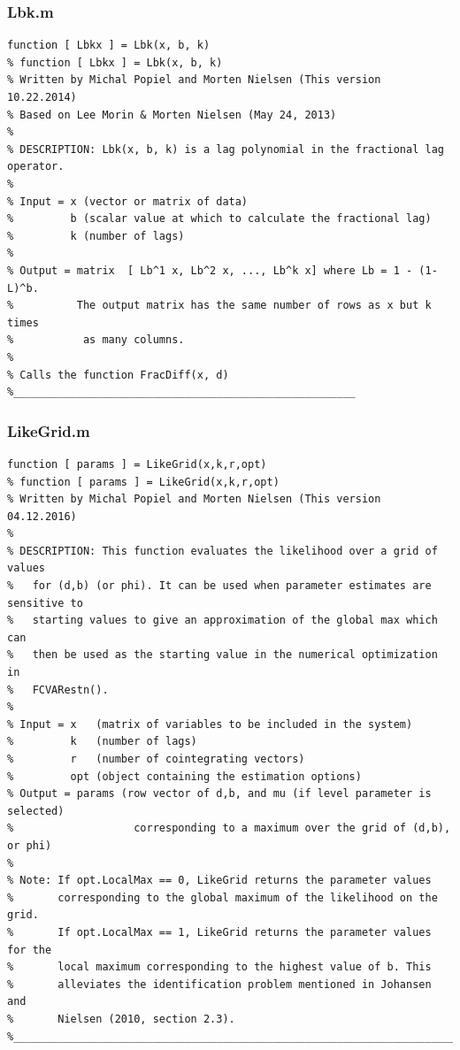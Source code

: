 \documentclass[10pt]{article}
\begin{document}
\subsubsection{Lbk.m}
\begin{lstlisting}[frame=single,caption={Lbk.m}]
function [ Lbkx ] = Lbk(x, b, k)
% function [ Lbkx ] = Lbk(x, b, k)
% Written by Michal Popiel and Morten Nielsen (This version 10.22.2014)
% Based on Lee Morin & Morten Nielsen (May 24, 2013)
%
% DESCRIPTION: Lbk(x, b, k) is a lag polynomial in the fractional lag operator.
%
% Input = x (vector or matrix of data)
%         b (scalar value at which to calculate the fractional lag)
%         k (number of lags)
% 
% Output = matrix  [ Lb^1 x, Lb^2 x, ..., Lb^k x] where Lb = 1 - (1-L)^b.
%          The output matrix has the same number of rows as x but k times 
%           as many columns.
% 
% Calls the function FracDiff(x, d) 
%______________________________________________________
\end{lstlisting}

\subsubsection{LikeGrid.m}

\begin{lstlisting}[frame=single,caption={LikeGrid.m}]
function [ params ] = LikeGrid(x,k,r,opt)
% function [ params ] = LikeGrid(x,k,r,opt)
% Written by Michal Popiel and Morten Nielsen (This version 04.12.2016)
% 
% DESCRIPTION: This function evaluates the likelihood over a grid of values
% 	for (d,b) (or phi). It can be used when parameter estimates are sensitive to 
% 	starting values to give an approximation of the global max which can 
% 	then be used as the starting value in the numerical optimization in 
% 	FCVARestn().
%
% Input = x   (matrix of variables to be included in the system)
%         k   (number of lags)
%         r   (number of cointegrating vectors)
%         opt (object containing the estimation options)
% Output = params (row vector of d,b, and mu (if level parameter is selected)
%					corresponding to a maximum over the grid of (d,b), or phi)
%
% Note:	If opt.LocalMax == 0, LikeGrid returns the parameter values
%       corresponding to the global maximum of the likelihood on the grid.
%       If opt.LocalMax == 1, LikeGrid returns the parameter values for the
%       local maximum corresponding to the highest value of b. This
%       alleviates the identification problem mentioned in Johansen and
%       Nielsen (2010, section 2.3).
%_________________________________________________________________________
\end{lstlisting}
\end{document}
